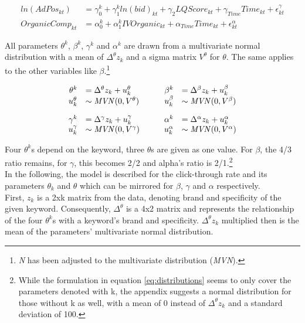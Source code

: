 \begin{equation} \label{eq:endogeneous}
    \begin{array}{ll}
     ln(AdPos_{kt})&= \gamma^{k}_{0} + \gamma^{k}_{1}ln(bid)_{kt} + \gamma_{2}LQScore_{kt} + \gamma_{Time}Time_{kt} + \epsilon^{\gamma}_{kt}\\[10pt]
     OrganicComp_{kt}&= \alpha^{k}_{0} + \alpha^{k}_{1}IVOrganic_{kt} + \alpha_{Time}Time_{kt} + \epsilon^{\alpha}_{kt}
    \end{array}
\end{equation}

All parameters $\theta^k$, $\beta^k$, $\gamma^k$ and $\alpha^k$ are drawn from a multivariate normal distribution with a mean of $\Delta^{\theta} z_{k}$ and a sigma matrix $V^{\theta}$ for $\theta$. The same applies to the other variables like $\beta$.\footnote{\textit{N} has been adjusted to the multivariate distribution (\textit{MVN}).}

\begin{equation}\label{eq:distributions}
    \begin{array}{rlrl}
    \theta^{k} &= \Delta^{\theta} z_{k} + u^{\theta}_{k} \quad\quad
    &\beta^{k} &= \Delta^{\beta} z_{k} + u^{\beta}_{k}\\
    u^{\theta}_{k} &\sim \text{\textit{MVN}} (0,V^{\theta}) \quad\quad
    &u^{\beta}_{k} &\sim \text{\textit{MVN}} (0,V^{\beta})\\[10pt]
    \gamma^{k} &= \Delta^{\gamma} z_{k} + u^{\gamma}_{k} \quad\quad
    &\alpha^{k} &= \Delta^{\alpha} z_{k} + u^{\alpha}_{k}\\
    u^{\gamma}_{k} &\sim \text{\textit{MVN}} (0,V^{\gamma}) \quad\quad
    &u^{\alpha}_{k} &\sim \text{\textit{MVN}} (0,V^{\alpha})
    \end{array}
\end{equation}

Four $\theta^k$s depend on the keyword, three $\theta$s are given as one value. For $\beta$, the 4/3 ratio remains, for $\gamma$, this becomes 2/2 and alpha's ratio is 2/1.\footnote{While the formulation in equation \ref{eq:distributions} seems to only cover the parameters denoted with k, the appendix suggests a normal distribution for those without k as well, with a mean of 0 instead of $\Delta^{\theta} z_{k}$ and a standard deviation of 100.}\\
In the following, the model is described for the click-through rate and its parameters $\theta_k$ and $\theta$ which can be mirrored for $\beta$, $\gamma$ and $\alpha$ respectively.\\
First, $z_k$ is a 2xk matrix from the data, denoting brand and specificity of the given keyword. Consequently, $\Delta^{\theta}$ is a 4x2 matrix and represents the relationship of the four $\theta^k$s with a keyword's brand and specificity. $\Delta^{\theta} z_k$ multiplied then is the mean of the parameters' multivariate normal distribution.

